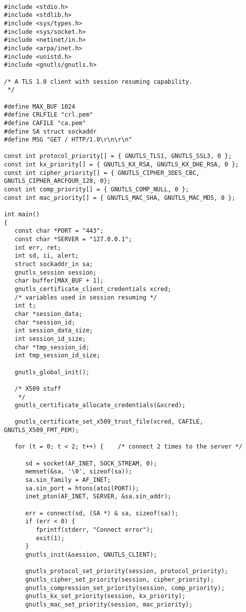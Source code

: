 \begin{verbatim}

#include <stdio.h>
#include <stdlib.h>
#include <sys/types.h>
#include <sys/socket.h>
#include <netinet/in.h>
#include <arpa/inet.h>
#include <unistd.h>
#include <gnutls/gnutls.h>

/* A TLS 1.0 client with session resuming capability.
 */

#define MAX_BUF 1024
#define CRLFILE "crl.pem"
#define CAFILE "ca.pem"
#define SA struct sockaddr
#define MSG "GET / HTTP/1.0\r\n\r\n"

const int protocol_priority[] = { GNUTLS_TLS1, GNUTLS_SSL3, 0 };
const int kx_priority[] = { GNUTLS_KX_RSA, GNUTLS_KX_DHE_RSA, 0 };
const int cipher_priority[] = { GNUTLS_CIPHER_3DES_CBC, GNUTLS_CIPHER_ARCFOUR_128, 0};
const int comp_priority[] = { GNUTLS_COMP_NULL, 0 };
const int mac_priority[] = { GNUTLS_MAC_SHA, GNUTLS_MAC_MD5, 0 };

int main()
{
   const char *PORT = "443";
   const char *SERVER = "127.0.0.1";
   int err, ret;
   int sd, ii, alert;
   struct sockaddr_in sa;
   gnutls_session session;
   char buffer[MAX_BUF + 1];
   gnutls_certificate_client_credentials xcred;
   /* variables used in session resuming */
   int t;
   char *session_data;
   char *session_id;
   int session_data_size;
   int session_id_size;
   char *tmp_session_id;
   int tmp_session_id_size;

   gnutls_global_init();

   /* X509 stuff 
    */
   gnutls_certificate_allocate_credentials(&xcred);

   gnutls_certificate_set_x509_trust_file(xcred, CAFILE, GNUTLS_X509_FMT_PEM);

   for (t = 0; t < 2; t++) {    /* connect 2 times to the server */

      sd = socket(AF_INET, SOCK_STREAM, 0);
      memset(&sa, '\0', sizeof(sa));
      sa.sin_family = AF_INET;
      sa.sin_port = htons(atoi(PORT));
      inet_pton(AF_INET, SERVER, &sa.sin_addr);

      err = connect(sd, (SA *) & sa, sizeof(sa));
      if (err < 0) {
         fprintf(stderr, "Connect error");
         exit(1);
      }
      gnutls_init(&session, GNUTLS_CLIENT);

      gnutls_protocol_set_priority(session, protocol_priority);
      gnutls_cipher_set_priority(session, cipher_priority);
      gnutls_compression_set_priority(session, comp_priority);
      gnutls_kx_set_priority(session, kx_priority);
      gnutls_mac_set_priority(session, mac_priority);


\end{verbatim}
